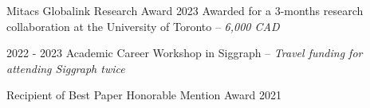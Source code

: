 

\begin{cventries}


  \cventry
    {Mitacs Globalink Research Award} %
    {2023} %
    {Awarded for a 3-months research collaboration at the University of Toronto -- \textit{6,000 CAD}} %

    {2022 - 2023} %
    {Academic Career Workshop in Siggraph -- \textit{Travel funding for attending Siggraph twice}} 

  \cventry
    {Recipient of Best Paper Honorable Mention Award} %
    {2021} %
    {
    } 

\end{cventries}
